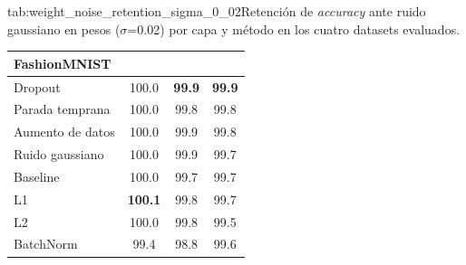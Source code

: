 \begin{table}{tab:weight_noise_retention_sigma_0_02}{Retención de \textit{accuracy} ante ruido gaussiano en pesos ($\sigma$=0.02) por capa y método en los cuatro datasets evaluados.}
\begin{tabular}{lccc}
\midrule
\multicolumn{4}{l}{\textbf{FashionMNIST}}\\
\midrule
Dropout & 100.0 & \textbf{99.9} & \textbf{99.9} \\
Parada temprana & 100.0 & 99.8 & 99.8 \\
Aumento de datos & 100.0 & 99.9 & 99.8 \\
Ruido gaussiano & 100.0 & 99.9 & 99.7 \\
Baseline & 100.0 & 99.7 & 99.7 \\
L1 & \textbf{100.1} & 99.8 & 99.7 \\
L2 & 100.0 & 99.8 & 99.5 \\
BatchNorm & 99.4 & 98.8 & 99.6 \\
\bottomrule
\end{tabular}
\end{table}